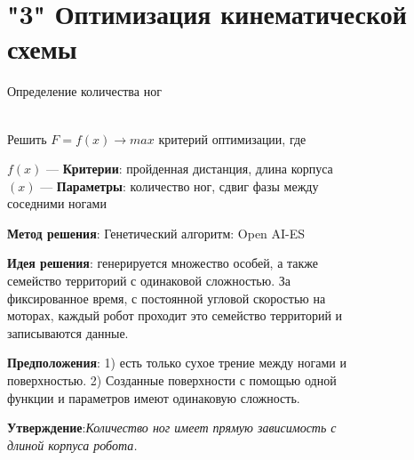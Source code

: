 \documentclass[aspectratio=169,xcolor=table,10pt]{beamer}
\begin{document}
\section{"3" Оптимизация кинематической схемы}

\begin{frame}[t]{Определение количества ног}
    \framesubtitle{}
    \begin{columns}[T,onlytextwidth]
        \begin{column}{0.59\textwidth}
            \small
            Решить $F=f(x) \rightarrow max$ критерий оптимизации, где

            $f(x)$ --- \textbf{ Критерии}: пройденная дистанция, длина корпуса\\
            $(x)$ --- \textbf{Параметры}: количество ног, сдвиг фазы между
            соседними ногами

            \textbf{Метод решения}: Генетический алгоритм: Open AI-ES

            \textbf{Идея решения}: генерируется множество особей, а
            также семейство территорий с одинаковой сложностью.
            За фиксированное время, с постоянной угловой скоростью
            на моторах, каждый робот проходит это семейство
            территорий и записываются данные.

            \textbf{Предположения}: 1) есть только сухое трение
            между ногами и поверхностью. 2) Созданные
            поверхности с помощью одной функции
            и параметров имеют одинаковую сложность.

            \textbf{Утверждение}:\textit{Количество ног имеет прямую
                зависимость с длиной корпуса робота.}
        \end{column}
        \begin{column}{0.39\textwidth}
            \begin{figure}[H]
                \begin{subfigure}{0.49\textwidth}
                    \centering\includegraphics[height=2cm,width=1\textwidth,keepaspectratio]{../images/terrain_1.jpg}
                \end{subfigure}
                \begin{subfigure}{0.49\textwidth}
                    \centering\includegraphics[height=2cm,width=1\textwidth,keepaspectratio]{../images/terrain_2.jpg}
                \end{subfigure}


\end{figure}
\end{column}
\end{columns}
\end{frame}
\end{document}
